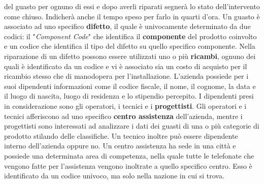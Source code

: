 \documentclass[a4paper, 12pt]{report}
\begin{document}
del guasto per ognuno di essi e dopo averli riparati segnerà lo stato dell'intervento come chiuso. Indicherà anche il tempo speso per farlo in quarti d'ora.\newline
Un guasto è associato ad uno specifico \textbf{difetto}, il quale è univocamente determinato da due codici: il "\textit{Component Code}"
che identifica il \textbf{componente} del prodotto coinvolto e un codice che identifica il tipo del difetto su quello specifico componente. Nella
riparazione di un difetto possono essere utilizzati uno o più \textbf{ricambi}, ognuno dei quali è identificato da un codice e vi è associato
sia un costo di acquisto per il ricambio stesso che di manodopera per l'installazione.\newline
L'azienda possiede per i suoi dipendenti informazioni come il codice fiscale, il nome, il cognome, la data e il luogo di nascita, luogo di
residenza e lo stipendio percepito. I dipendenti presi in considerazione sono gli operatori, i tecnici e i
\textbf{progettisti}. Gli operatori e i tecnici afferiscono ad uno specifico \textbf{centro assistenza} dell'azienda,
mentre i progettisti sono interessati ad analizzare i dati dei guasti di una o più categorie di prodotto stilando delle classifiche. Un tecnico
inoltre può essere dipendente interno dell'azienda oppure no.\newline
Un centro assistenza ha sede in una città e possiede una determinata area di competenza, nella quale tutte le telefonate che vengono fatte
per l'assistenza vengono inoltrate a quello specifico centro. Esso è identificato da un codice univoco, ma solo nella nazione in cui si trova.\newline
\end{document}
